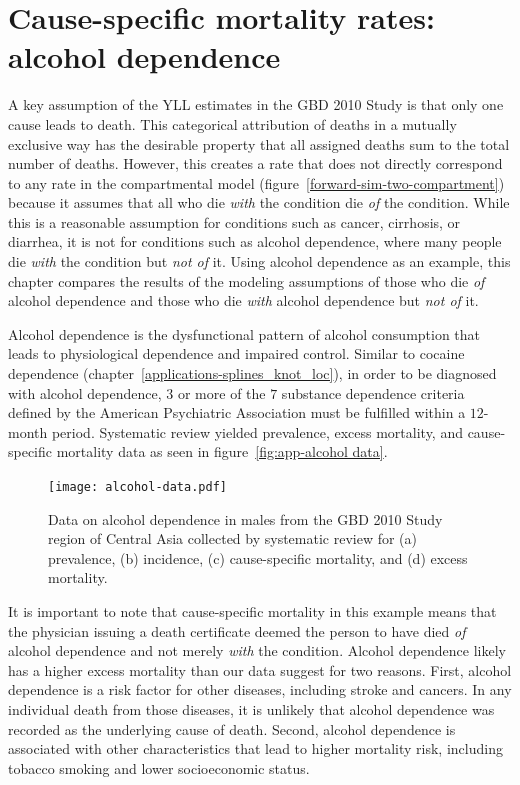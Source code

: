 \chapter{Cause-specific mortality rates: alcohol dependence}
\label{applications-csmr}

A key assumption of the YLL estimates in the GBD 2010 Study is that only
one cause leads to death.  This categorical attribution of deaths in
a mutually exclusive way has the desirable property that all assigned
deaths sum to the total number of deaths.  However, this
creates a rate that does not directly correspond to any rate in the
compartmental model (figure~\ref{forward-sim-two-compartment}) because it
assumes that all who die \emph{with} the condition die \emph{of} the
condition.  While this is a reasonable assumption for conditions
such as cancer, cirrhosis, or diarrhea, it is not for conditions such as
alcohol dependence, where many people die \emph{with}
the condition but \emph{not of} it.  Using alcohol dependence as an
example, this chapter compares the results of
the modeling assumptions of those who die \emph{of} alcohol dependence
and those who die \emph{with} alcohol dependence but \emph{not of} it.

Alcohol dependence is the dysfunctional pattern of alcohol consumption
that leads to physiological dependence and impaired control.  Similar to
cocaine dependence (chapter~\ref{applications-splines_knot_loc}), in order to
be diagnosed with alcohol dependence, $3$ or more of the $7$
substance dependence criteria defined by the American Psychiatric
Association must be
fulfilled within a $12$-month period.
\cite{american_psychiatric_association_diagnostic_2000, hasin_prevalence_2007}
Systematic review yielded prevalence, excess mortality, and
cause-specific mortality data as seen in figure~\ref{fig:app-alcohol
  data}.

    \begin{figure}[h]
        \begin{center}
            \texttt{[image: alcohol-data.pdf]}
            \caption{Data on alcohol
              dependence in males from the GBD 2010 Study region of
              Central Asia collected by systematic review for (a) prevalence, (b) incidence, (c)
              cause-specific mortality, and (d) excess mortality.}
            \label{fig:app-alcohol data}
        \end{center}
    \end{figure}

It is important to note that cause-specific mortality in this example
means that the physician issuing a death certificate deemed the person
to have died \emph{of} alcohol dependence and not merely \emph{with} the
condition.  Alcohol dependence likely has a higher excess mortality
than our data suggest for two reasons.  First, alcohol dependence is
a risk factor for other diseases, including stroke and cancers.  In
any individual death from those diseases, it is unlikely that alcohol
dependence was recorded as the underlying cause of
death.\cite{TK_citation_needed} Second, alcohol dependence is
associated with other characteristics that lead to higher mortality
risk, including tobacco smoking and lower socioeconomic
status.\cite{TK_citation_needed}

